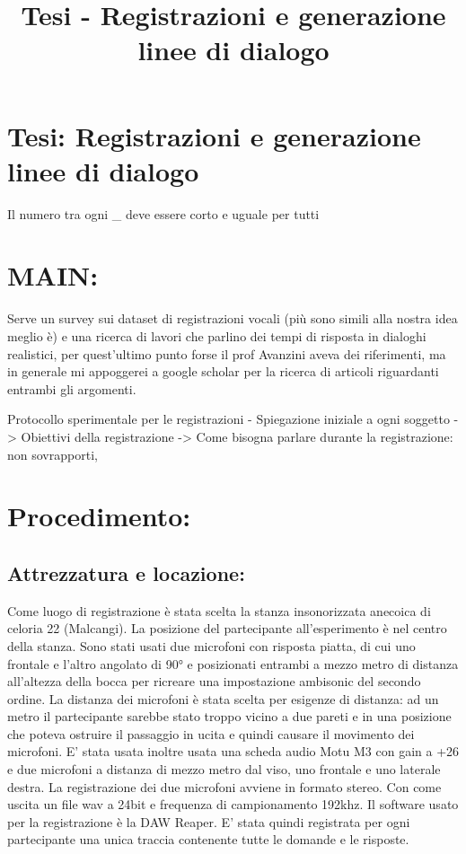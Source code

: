 \documentclass[
]{article}
\title{Tesi - Registrazioni e generazione linee di dialogo}
\author{}
\date{}
\begin{document}
\maketitle

{
\setcounter{tocdepth}{2}
\tableofcontents
}
\section{Tesi: Registrazioni e generazione linee di dialogo}\label{tesi-registrazioni-e-generazione-linee-di-dialogo}

Il numero tra ogni \_ deve essere corto e uguale per tutti

\section{MAIN:}\label{main}

Serve un survey sui dataset di registrazioni vocali (più sono simili alla nostra idea meglio è) e una ricerca di lavori che parlino dei tempi di risposta in dialoghi realistici, per quest'ultimo punto forse il prof Avanzini aveva dei riferimenti, ma in generale mi appoggerei a google scholar per la ricerca di articoli riguardanti entrambi gli argomenti.

Protocollo sperimentale per le registrazioni - Spiegazione iniziale a ogni soggetto -\textgreater{} Obiettivi della registrazione -\textgreater{} Come bisogna parlare durante la registrazione: non sovrapporti,

\section{Procedimento:}\label{procedimento}

\subsection{Attrezzatura e locazione:}\label{attrezzatura-e-locazione}

Come luogo di registrazione è stata scelta la stanza insonorizzata anecoica di celoria 22 (Malcangi). La posizione del partecipante all'esperimento è nel centro della stanza. Sono stati usati due microfoni con risposta piatta, di cui uno frontale e l'altro angolato di 90° e posizionati entrambi a mezzo metro di distanza all'altezza della bocca per ricreare una impostazione ambisonic del secondo ordine. La distanza dei microfoni è stata scelta per esigenze di distanza: ad un metro il partecipante sarebbe stato troppo vicino a due pareti e in una posizione che poteva ostruire il passaggio in ucita e quindi causare il movimento dei microfoni. E' stata usata inoltre usata una scheda audio Motu M3 con gain a +26 e due microfoni a distanza di mezzo metro dal viso, uno frontale e uno laterale destra. La registrazione dei due microfoni avviene in formato stereo. Con come uscita un file wav a 24bit e frequenza di campionamento 192khz. Il software usato per la registrazione è la DAW Reaper. E' stata quindi registrata per ogni partecipante una unica traccia contenente tutte le domande e le risposte.
\end{document}
